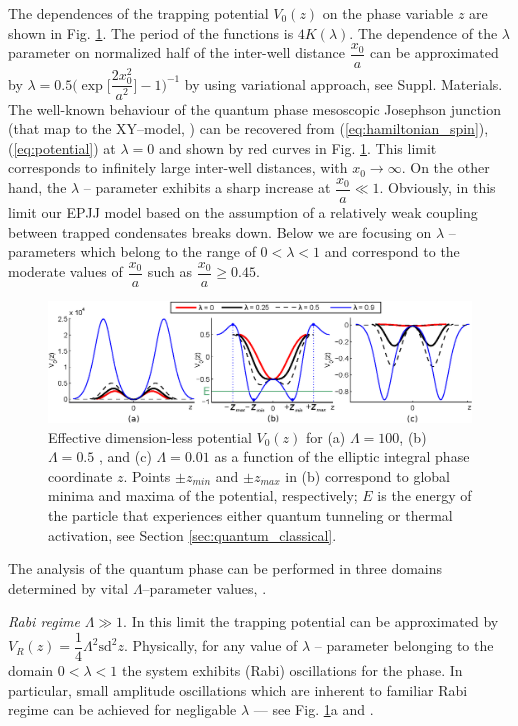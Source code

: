 \documentclass[fleqn,10pt]{wlscirep}
\newcommand{\sd}{\textrm{sd}}
\begin{document}
The dependences of the trapping potential $V_0(z)$ on the phase variable $z$ are shown in Fig. \ref{pic:phase_potential}. The period of the functions is  $4K(\lambda)$.
The dependence of the $\lambda$ parameter on normalized half of the inter-well distance $\dfrac{x_0}{a}$ can be approximated by $\lambda = 0.5 \Big( \exp \Big[ \dfrac{2 x_0^2}{a^2} \Big] - 1 \Big)^{-1}$ by using variational approach,  see Suppl. Materials.
The well-known behaviour of the quantum phase mesoscopic Josephson junction (that map to the XY--model, \cite{Lago1, Lago2} ) can be recovered from (\ref{eq:hamiltonian_spin}), (\ref{eq:potential}) at $\lambda = 0$ and shown by red curves in Fig. \ref{pic:phase_potential}. This limit corresponds to  infinitely large inter-well distances, with $x_0 \to \infty$.
On the other hand, the $\lambda$ -- parameter exhibits a sharp increase at $\dfrac{x_0}{a} \ll 1$.
Obviously, in this limit our EPJJ model based on the assumption of a relatively weak coupling between trapped condensates breaks down.
Below we are focusing on $\lambda$ -- parameters which belong to the range of $0 < \lambda < 1$ and correspond to the moderate values of $\dfrac{x_0}{a}$ such as $\dfrac{x_0}{a} \geq 0.45$. 
%
\begin{figure}[ht]
\begin{center}\includegraphics[width=1\linewidth]{pic/potentials.eps}
\end{center}
\caption{
Effective dimension-less potential $V_0(z)$ for (a) $\Lambda = 100$, (b) $\Lambda = 0.5$ , and (c) $\Lambda = 0.01$ as a function of the elliptic integral phase coordinate $z$.
Points $\pm z_{min}$ and $\pm z_{max}$ in (b) correspond to global minima and maxima of the potential, respectively; $E$ is the energy of the particle that experiences either quantum tunneling or thermal activation, see Section \ref{sec:quantum_classical}.
\label{pic:phase_potential}}
\end{figure}
%
The analysis of the quantum phase can be performed in three domains determined by vital $\Lambda$--parameter values, \cite{Anglin}.

\textit{Rabi regime} $\Lambda \gg 1$. In this limit the trapping potential can be approximated by $V_R(z) = \dfrac{1}{4} \Lambda^2 \sd^2{z}$.
Physically, for any value of $\lambda$ -- parameter belonging to the domain 0$<\lambda <1$ the system exhibits (Rabi) oscillations for the phase.
In particular, small amplitude oscillations which are inherent to familiar Rabi regime can be achieved for negligable $\lambda$ --- see Fig. \ref{pic:phase_potential}a and \cite{Anglin}.
\end{document}
